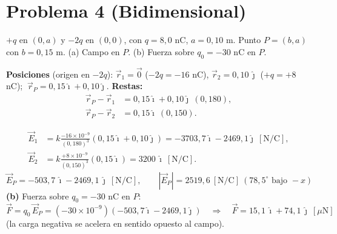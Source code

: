 \documentclass[12pt,letterpaper]{article}
\begin{document}
\clearpage
\section*{\textcolor{ubbblue}{Problema 4 (Bidimensional)}}
$+q$ en $(0,a)$ y $-2q$ en $(0,0)$, con $q=8{,}0$ nC, $a=0{,}10$ m. Punto $P=(b,a)$ con $b=0{,}15$ m.
(a) Campo en $P$. (b) Fuerza sobre $q_0=-30$ nC en $P$.

\medskip
\noindent
\begin{minipage}[t]{0.36\textwidth}
\centering\vspace{0pt}
\end{minipage}%
\hfill
\begin{minipage}[t]{0.60\textwidth}
\vspace{0pt}
\textbf{Posiciones} (origen en $-2q$): $\vec r_1=\vec 0$ ($-2q=-16$ nC), $\vec r_2=0{,}10\,\hat\jmath$
($+q=+8$ nC); $\ \vec r_P=0{,}15\hat\imath+0{,}10\hat\jmath$.
\smallskip
\textbf{Restas:}
\begin{align*}
    \vec r_P-\vec r_1 &= 0{,}15\hat\imath+0{,}10\hat\jmath\ (0{,}180),\\
    \vec r_P-\vec r_2 &= 0{,}15\hat\imath\ (0{,}150).
\end{align*}
\end{minipage}

\begin{align*}
    \vec E_1 &= k\frac{-16\times10^{-9}}{(0{,}180)^{3}}(0{,}15\hat\imath+0{,}10\hat\jmath) = -3703{,}7\hat\imath-2469{,}1\hat\jmath\ [\text{N/C}],\\
    \vec E_2 &= k\frac{+8\times10^{-9}}{(0{,}150)^{3}}(0{,}15\hat\imath) = 3200\,\hat\imath\ [\text{N/C}].
\end{align*}
\[
    \boxed{\vec E_P = -503{,}7\,\hat\imath - 2469{,}1\,\hat\jmath\ [\text{N/C}],\qquad
    |\vec E_P| = 2519{,}6\ [\text{N/C}]\ (78{,}5^\circ\text{ bajo }-x)}
\]
\noindent\textbf{(b)} Fuerza sobre $q_0=-30$ nC en $P$:
\[
    \vec F = q_0\,\vec E_P = (-30\times10^{-9})(-503{,}7\hat\imath-2469{,}1\hat\jmath)
    \quad\Longrightarrow\quad
    \boxed{\vec F = 15{,}1\,\hat\imath + 74{,}1\,\hat\jmath\ [\mu\text{N}]}
\]
(la carga negativa se acelera en sentido opuesto al campo).
\end{document}
